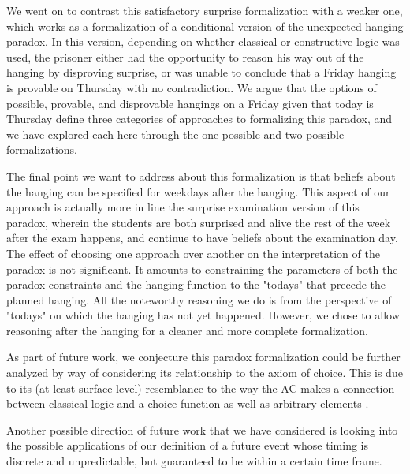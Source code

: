 \documentclass[runningheads]{llncs}
\newenvironment{myindent}{\begin{adjustwidth}{1cm}{}}{\end{adjustwidth}}
\begin{document}
We went on to contrast this satisfactory surprise formalization with a weaker one,
which works as a formalization of a conditional version of the unexpected hanging paradox.
In this version, depending on whether classical or constructive logic was used,
the prisoner either had the opportunity to reason his way out of the
hanging by disproving surprise, or was unable to conclude that a Friday hanging is provable
on Thursday with no contradiction. We argue that the options of possible,
provable, and disprovable hangings on a Friday given that today is Thursday define three categories of
approaches to formalizing this paradox, and we have explored each here
through the one-possible and two-possible formalizations.

The final point we want to address about this formalization is that beliefs about
the hanging can be specified for weekdays after the hanging.
This aspect of our approach is actually more in line the surprise examination version of this paradox,
wherein the students are both surprised and alive the rest of the week after the exam happens,
and continue to have beliefs about the examination day. The effect of choosing
one approach over another on the interpretation of the paradox is not significant.
It amounts to constraining the parameters of both the paradox constraints and
the hanging function to the "todays" that precede the planned hanging. All the noteworthy
reasoning we do is from the perspective of
 "todays" on which the hanging has not yet happened.
However, we chose to allow reasoning after the hanging for a cleaner and more
complete formalization.

As part of future work, we conjecture this paradox formalization could be further analyzed by way of considering its
relationship to the axiom of choice. This is due to its (at least surface level)
resemblance to the way the AC makes a connection between classical logic
and a choice function \cite{accomp} as well as arbitrary elements \cite{randomness}.

Another possible direction of future work that we have considered is looking into the
possible applications of our definition of a future event whose timing is discrete
and unpredictable,
but guaranteed to be within a certain time frame.

%
\end{document}
